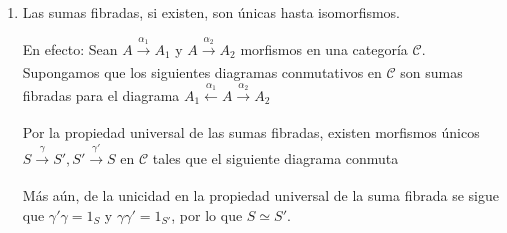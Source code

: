 \documentclass[tesis]{subfiles}
\begin{document}
\begin{Obs}\leavevmode\label{Obs: Sumas fibradas}
    \begin{enumerate}[label=(\arabic*)]
    
        \item Las sumas fibradas, si existen, son únicas hasta isomorfismos.

        En efecto: Sean $A\xrightarrow[]{\alpha_1} A_1$ y $A\xrightarrow[]{\alpha_2} A_2$ morfismos en una categoría $\mathscr{C}$. Supongamos que los siguientes diagramas conmutativos en $\mathscr{C}$ son sumas fibradas para el diagrama $A_1\xleftarrow[]{\alpha_1}A\xrightarrow[]{\alpha_2}A_2$
        \begin{center}
        \end{center}
        Por la propiedad universal de las sumas fibradas, existen morfismos únicos $S\xrightarrow[]{\gamma} S',S'\xrightarrow[]{\gamma'} S$ en $\mathscr{C}$ tales que el siguiente diagrama conmuta
        \begin{center}
        \end{center}
        Más aún, de la unicidad en la propiedad universal de la suma fibrada se sigue que $\gamma'\gamma=1_S$ y $\gamma\gamma'=1_{S'}$, por lo que $S\simeq S'$.


\end{enumerate}
\end{Obs}
\end{document}
